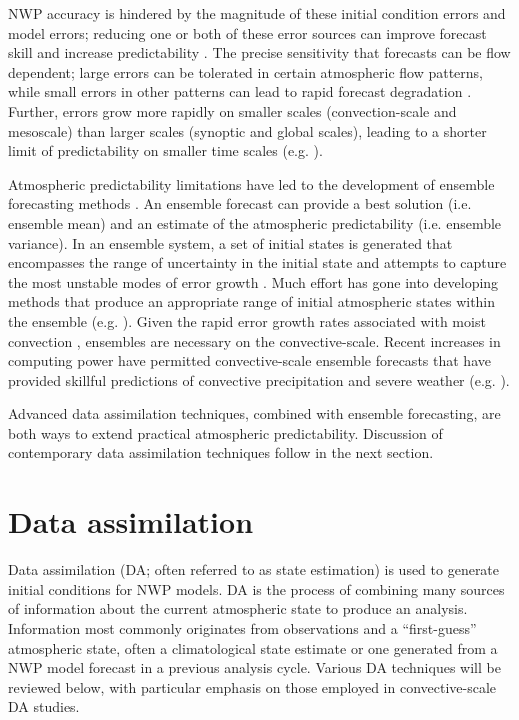 NWP accuracy is hindered by the magnitude of these initial condition errors and model errors; reducing one or both of these error sources can improve forecast skill and increase predictability \citep{lorenz65}. The precise sensitivity that forecasts can be flow dependent; large errors can be tolerated in certain atmospheric flow patterns, while small errors in other patterns can lead to rapid forecast degradation \citep{lorenz65,zhangetal06b}. Further, errors grow more rapidly on smaller scales (convection-scale and mesoscale) than larger scales (synoptic and global scales), leading to a shorter limit of predictability on smaller time scales (e.g. \citealt{zhangetal03}).

Atmospheric predictability limitations have led to the development of ensemble forecasting methods \citep{leith74,tractonkalnay93}. An ensemble forecast can provide a best solution (i.e. ensemble mean) and an estimate of the atmospheric predictability (i.e. ensemble variance). In an ensemble system, a set of initial states is generated that encompasses the range of uncertainty in the initial state and attempts to capture the most unstable modes of error growth \citep{tothkalnay93}. Much effort has gone into developing methods that produce an appropriate range of initial atmospheric states within the ensemble (e.g. \citealt{leith74,hoffmankalnay83,tothkalnay93,palmeretal92}). Given the rapid error growth rates associated with moist convection \citep{zhangetal06b}, ensembles are necessary on the convective-scale. Recent increases in computing power have permitted convective-scale ensemble forecasts that have provided skillful predictions of convective precipitation and severe weather (e.g. \citealt{kongetal06,clarketal09,clarketal10}).

Advanced data assimilation techniques, combined with ensemble forecasting, are both ways to extend practical atmospheric predictability. Discussion of contemporary data assimilation techniques follow in the next section.

\pagebreak
\section{Data assimilation}
Data assimilation (DA; often referred to as state estimation) is used to generate initial conditions for NWP models. DA is the process of combining many sources of information about the current atmospheric state to produce an analysis. Information most commonly originates from observations and a “first-guess” atmospheric state, often a climatological state estimate or one generated from a NWP model forecast in a previous analysis cycle. Various DA techniques will be reviewed below, with particular emphasis on those employed in convective-scale DA studies.

